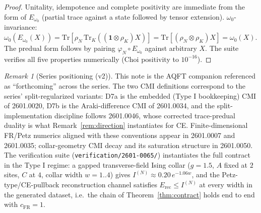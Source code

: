 \documentclass[11pt]{article}
\theoremstyle{definition}
\theoremstyle{remark}
\newtheorem{remark}[theorem]{Remark}
\newcommand{\Erec}{E_{\mathrm{rec}}}
\begin{document}
\begin{proof}
Unitality, idempotence and complete positivity are immediate from the
form of $E_{\omega_0}$ (partial trace against a state followed by tensor
extension). $\omega_0$-invariance:
$\omega_0(E_{\omega_0}(X)) = \mathrm{Tr}[\rho_N\,
\mathrm{Tr}_K((\mathbf{1} \otimes \rho_K)X)] = \mathrm{Tr}[(\rho_N
\otimes \rho_K) X] = \omega_0(X)$. The predual form follows by pairing
$\varphi_N \circ E_{\omega_0}$ against arbitrary $X$. The suite verifies
all five properties numerically (Choi positivity to $10^{-16}$).
\end{proof}

\begin{remark}[Series positioning (v2)]
\label{rem:series}
This note is the AQFT companion referenced as ``forthcoming'' across the
series. The two CMI definitions correspond to the series'
split-regularized variants: D7a is the embedded (Type I bookkeeping)
CMI of 2601.0020, D7b is the Araki-difference CMI of 2601.0034, and the
split-implementation discipline follows 2601.0046, whose corrected
trace-predual duality is what Remark~\ref{rem:direction} instantiates
for CE. Finite-dimensional FR/Petz numerics aligned with these
conventions appear in 2601.0007 and 2601.0035; collar-geometry CMI
decay and its saturation structure in 2601.0050. The verification suite
(\texttt{verification/2601-0065/}) instantiates the full contract in the
Type I regime: a gapped transverse-field Ising collar ($g = 1.5$, $A$
fixed at $2$ sites, $C$ at $4$, collar width $w = 1..4$) gives
$I^{(N)} \approx 0.20\, e^{-1.06 w}$, and the Petz-type/CE-pullback reconstruction channel
satisfies $\Erec \le I^{(N)}$ at every width in the generated dataset,
i.e.\ the chain of Theorem~\ref{thm:contract} holds end to end with
$c_{\mathrm{FR}} = 1$.
\end{remark}
\end{document}
